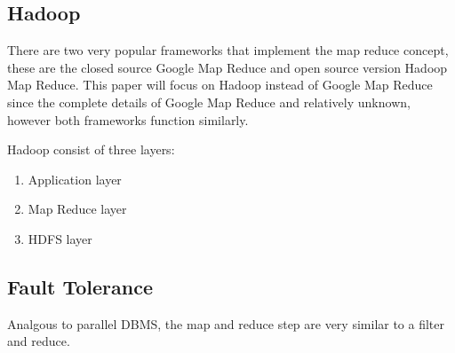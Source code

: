 \documentclass[10pt,twocolumn]{IEEEtran11}
\begin{document}
\subsection{Hadoop}
There are two very popular frameworks that implement the map reduce concept, these are the closed source Google Map Reduce and open source version Hadoop Map Reduce.  
This paper will focus on Hadoop instead of Google Map Reduce since the complete details of Google Map Reduce and relatively unknown, however both frameworks function similarly.
\par
Hadoop consist of three layers:
\begin{enumerate}
	\item Application layer
	\item Map Reduce layer
	\item HDFS layer
\end{enumerate} 




\subsection{Fault Tolerance}





Analgous to parallel DBMS, the map and reduce step are very similar to a filter and reduce.


























\end{document}
